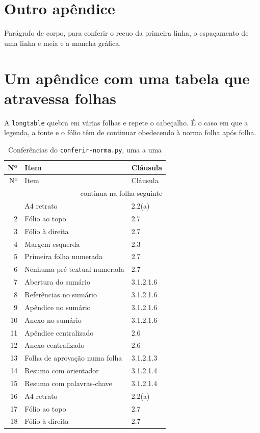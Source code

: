 \documentclass[dsc,pdfa,coorientador,dadoscoleta]{ufrj}
\begin{document}
  \chapter{Outro apêndice}
  Parágrafo de corpo, para conferir o recuo da primeira linha, o espaçamento de uma linha e meia e a mancha gráfica.
  \chapter{Um apêndice com uma tabela que atravessa folhas}
  A \texttt{longtable} quebra em várias folhas e repete o cabeçalho.
  É o caso em que a legenda, a fonte e o fólio têm de continuar
  obedecendo à norma folha após folha.
  \begin{longtable}{rll}
    \caption{Conferências do \texttt{conferir-norma.py}, uma a uma}
    \label{tab:long}\\
    \hline Nº & Item & Cláusula\\ \hline
    \endfirsthead
    \hline Nº & Item & Cláusula\\ \hline
    \endhead
    \hline \multicolumn{3}{r}{\footnotesize continua na folha seguinte}\\
    \endfoot
    \hline
    \endlastfoot
    1 & A4 retrato & 2.2(a)\\
    2 & Fólio ao topo & 2.7\\
    3 & Fólio à direita & 2.7\\
    4 & Margem esquerda & 2.3\\
    5 & Primeira folha numerada & 2.7\\
    6 & Nenhuma pré-textual numerada & 2.7\\
    7 & Abertura do sumário & 3.1.2.1.6\\
    8 & Referências no sumário & 3.1.2.1.6\\
    9 & Apêndice no sumário & 3.1.2.1.6\\
    10 & Anexo no sumário & 3.1.2.1.6\\
    11 & Apêndice centralizado & 2.6\\
    12 & Anexo centralizado & 2.6\\
    13 & Folha de aprovação numa folha & 3.1.2.1.3\\
    14 & Resumo com orientador & 3.1.2.1.4\\
    15 & Resumo com palavras-chave & 3.1.2.1.4\\
    16 & A4 retrato & 2.2(a)\\
    17 & Fólio ao topo & 2.7\\
    18 & Fólio à direita & 2.7\\

\end{longtable}
\end{document}
